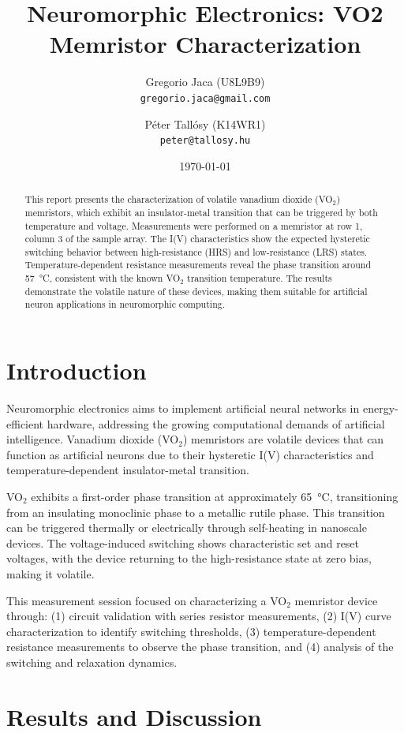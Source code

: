 \documentclass[12pt,a4paper]{article}
\title{Neuromorphic Electronics: VO2 Memristor Characterization}
\author{Gregorio Jaca (U8L9B9)\\\texttt{gregorio.jaca@gmail.com} \and P\'eter Tall\'osy (K14WR1)\\\texttt{peter@tallosy.hu}}
\date{\today}
\begin{document}
\maketitle

\begin{abstract}
This report presents the characterization of volatile vanadium dioxide (VO$_2$) memristors, which exhibit an insulator-metal transition that can be triggered by both temperature and voltage. Measurements were performed on a memristor at row 1, column 3 of the sample array. The I(V) characteristics show the expected hysteretic switching behavior between high-resistance (HRS) and low-resistance (LRS) states. Temperature-dependent resistance measurements reveal the phase transition around \SI{57}{\celsius}, consistent with the known VO$_2$ transition temperature. The results demonstrate the volatile nature of these devices, making them suitable for artificial neuron applications in neuromorphic computing.
\end{abstract}

\section{Introduction}

Neuromorphic electronics aims to implement artificial neural networks in energy-efficient hardware, addressing the growing computational demands of artificial intelligence. Vanadium dioxide (VO$_2$) memristors are volatile devices that can function as artificial neurons due to their hysteretic I(V) characteristics and temperature-dependent insulator-metal transition.

VO$_2$ exhibits a first-order phase transition at approximately \SI{65}{\celsius}, transitioning from an insulating monoclinic phase to a metallic rutile phase. This transition can be triggered thermally or electrically through self-heating in nanoscale devices. The voltage-induced switching shows characteristic set and reset voltages, with the device returning to the high-resistance state at zero bias, making it volatile.

This measurement session focused on characterizing a VO$_2$ memristor device through: (1) circuit validation with series resistor measurements, (2) I(V) curve characterization to identify switching thresholds, (3) temperature-dependent resistance measurements to observe the phase transition, and (4) analysis of the switching and relaxation dynamics.

\section{Results and Discussion}
\end{document}
